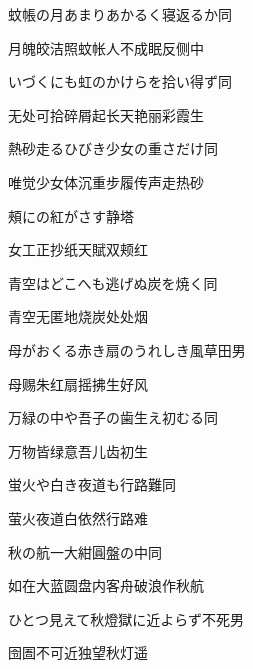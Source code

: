 \begin{haiku}
    {\FH 蚊帳の月あまりあかるく寝返るか}\hfill{\FH 同}

    {\FK 月魄皎洁照蚊帐人不成眠反侧中}
\end{haiku}

\begin{haiku}
    {\FH いづくにも虹のかけらを拾い得ず}\hfill{\FH 同}

    {\FK 无处可拾碎屑起长天艳丽彩霞生}
\end{haiku}

\begin{haiku}
    {\FH 熱砂走るひびき少女の重さだけ}\hfill{\FH 同}

    {\FK 唯觉少女体沉重步履传声走热砂}
\end{haiku}

\begin{haiku}
    {\FH {}頰にの紅がさす}\hfill{\FH 静塔}

    {\FK 女工正抄纸天賦双颊红}
\end{haiku}

\begin{haiku}
    {\FH 青空はどこへも逃げぬ炭を焼く}\hfill{\FH 同}

    {\FK 青空无匿地烧炭处处烟}
\end{haiku}

\begin{haiku}
    {\FH 母がおくる赤き扇のうれしき風}\hfill{\FH 草田男}

    {\FK 母赐朱红扇摇拂生好风}
\end{haiku}

\begin{haiku}
    {\FH 万緑の中や吾子の歯生え初むる}\hfill{\FH 同}

    {\FK 万物皆绿意吾儿齿初生}
\end{haiku}

\begin{haiku}
    {\FH 蛍火や白き夜道も行路難}\hfill{\FH 同}

    {\FK 萤火夜道白依然行路难}
\end{haiku}

\begin{haiku}
    {\FH 秋の航一大紺圓盤の中}\hfill{\FH 同}

    {\FK 如在大蓝圆盘内客舟破浪作秋航}
\end{haiku}

\begin{haiku}
    {\FH ひとつ見えて秋燈獄に近よらず}\hfill{\FH 不死男}

    {\FK 囹圄不可近独望秋灯遥}
\end{haiku}

